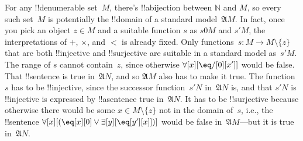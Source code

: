 \documentclass[10pt,a4paper]{article}
\theoremstyle{plain}
\theoremstyle{definition}
\theoremstyle{remark}
\newenvironment{explain}{}{}
\providecommand{\lforall}{\mathord{\forall}}
\providecommand{\lexists}{\mathord{\exists}}
\providecommand{\Obj}{}
\providecommand{\Struct}{\ensuremath{\mathfrak{A}}}
\providecommand{\Assign}{\ensuremath{s}}
\providecommand{\Nat}{\ensuremath{\mathbb{N}}}
\begin{document}
\begin{explain}
For any !!{denumerable} set~$M$, there's !!a{bijection} between
$\Nat$ and $M$, so every such set~$M$ is potentially the !!{domain} of
a standard model~$\Struct{M}$. In fact, once you pick an object $z \in
M$ and a suitable function $s$ as $\Assign{\Obj{0}}{M}$ and
$\Assign{\prime}{M}$, the interpretations of $+$, $\times$, and $<$ is
already fixed.  Only functions~$s\colon M \to M \setminus \{z\}$ that
are both !!{injective} and !!{surjective} are suitable in a standard
model as~$\Assign{\prime}{M}$.  The range of $s$ cannot contain~$z$,
since otherwise $\lforall[x][\eq/[\Obj 0][x']]$ would be false. That
!!{sentence} is true in~$\Struct{N}$, and so $\Struct{M}$ also has to
make it true. The function~$s$ has to be !!{injective}, since the
successor function~$\Assign{\prime}{N}$ in~$\Struct{N}$ is, and that
$\Assign{\prime}{N}$ is !!{injective} is expressed by !!a{sentence}
true in~$\Struct{N}$. It has to be !!{surjective} because otherwise
there would be some $x \in M \setminus \{z\}$ not in the domain
of~$s$, i.e., the !!{sentence} $\lforall[x][(\eq[x][\Obj 0] \lor
\lexists[y][\eq[y'][x]])]$ would be false in~$\Struct{M}$---but it is
true in~$\Struct{N}$.
\end{explain}
\end{document}

